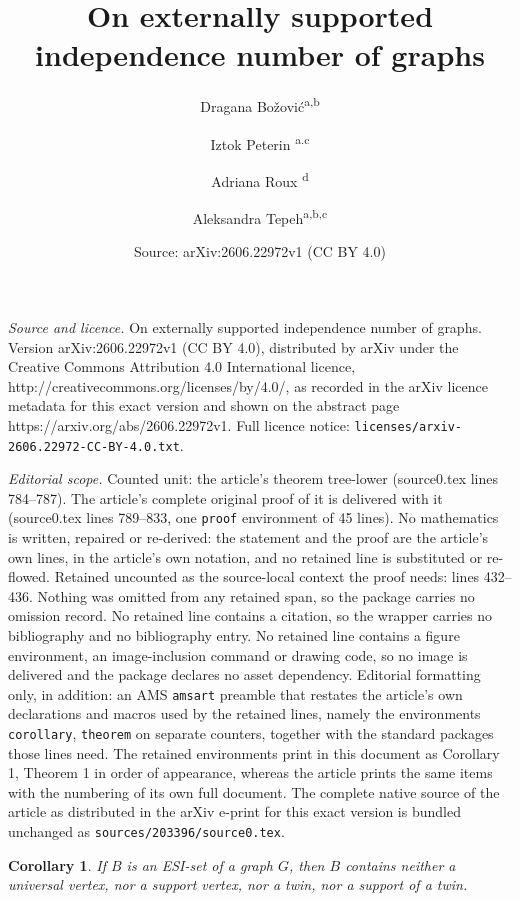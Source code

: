 \documentclass[10pt,a4paper]{amsart}
\title{On externally supported independence number of graphs}
\author{Dragana Bo\v zovi\'{c}\textsuperscript{a,b} \and Iztok Peterin \textsuperscript{a.c} \and Adriana Roux \textsuperscript{d} \and Aleksandra Tepeh\textsuperscript{a,b,c}}
\date{Source: arXiv:2606.22972v1 (CC BY 4.0)}
\newtheorem{corollary}{Corollary}
\begin{document}
\maketitle

\noindent\emph{Source and licence.} On externally supported independence number of graphs. Version arXiv:2606.22972v1 (CC BY 4.0), distributed by arXiv under the Creative Commons Attribution 4.0 International licence, http://creativecommons.org/licenses/by/4.0/, as recorded in the arXiv licence metadata for this exact version and shown on the abstract page https://arxiv.org/abs/2606.22972v1. Full licence notice: \texttt{licenses/arxiv-2606.22972-CC-BY-4.0.txt}.\par\smallskip

\noindent\textit{Editorial scope.} Counted unit: the article's theorem tree-lower (source0.tex lines 784--787). The article's complete original proof of it is delivered with it (source0.tex lines 789--833, one \texttt{proof} environment of 45 lines). No mathematics is written, repaired or re-derived: the statement and the proof are the article's own lines, in the article's own notation, and no retained line is substituted or re-flowed.  Retained uncounted as the source-local context the proof needs: lines 432--436.  Nothing was omitted from any retained span, so the package carries no omission record.  No retained line contains a citation, so the wrapper carries no bibliography and no bibliography entry.  No retained line contains a figure environment, an image-inclusion command or drawing code, so no image is delivered and the package declares no asset dependency.  Editorial formatting only, in addition: an AMS \texttt{amsart} preamble that restates the article's own declarations and macros used by the retained lines, namely the environments \texttt{corollary}, \texttt{theorem} on separate counters, together with the standard packages those lines need.  The retained environments print in this document as Corollary 1, Theorem 1 in order of appearance, whereas the article prints the same items with the numbering of its own full document.  The complete native source of the article as distributed in the arXiv e-print for this exact version is bundled unchanged as \texttt{sources/203396/source0.tex}.
\begin{corollary}
\label{notESI1}
If $B$ is an ESI-set of a graph $G$, then $B$ contains neither a universal vertex, nor a
support vertex, nor a twin, nor a support of a twin.
\end{corollary}
\end{document}
